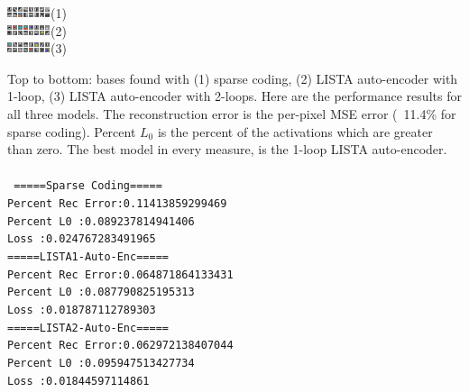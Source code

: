 \documentclass[12pt,a4paper]{report}
\begin{document}
\begin{center}
\includegraphics[scale=4]{dec_SC2.png}(1) \\
\vspace{0.5cm} 
\includegraphics[scale=4]{LISTA1_dec.png}(2) \\
\vspace{0.5cm} 
\includegraphics[scale=4]{LISTA2_dec.png}(3)
\end{center}
Top to bottom: bases found with (1) sparse coding, (2) LISTA auto-encoder with 1-loop, (3) LISTA auto-encoder with 2-loops. 
Here are the performance results for all three models. The reconstruction error is the per-pixel MSE error (~11.4\% for sparse coding). Percent $L_0$ is the percent of the activations which are greater than zero. The best model in every measure, is the 1-loop LISTA auto-encoder. 
\\ \\    
\texttt{ 
=====Sparse Coding===== \\
Percent Rec Error:0.11413859299469\\
Percent L0       :0.089237814941406\\
Loss             :0.024767283491965\\
=====LISTA1-Auto-Enc=====\\
Percent Rec Error:0.064871864133431\\
Percent L0       :0.087790825195313\\
Loss             :0.018787112789303\\
=====LISTA2-Auto-Enc=====\\
Percent Rec Error:0.062972138407044\\
Percent L0       :0.095947513427734\\
Loss             :0.01844597114861\\
}
\end{document}
